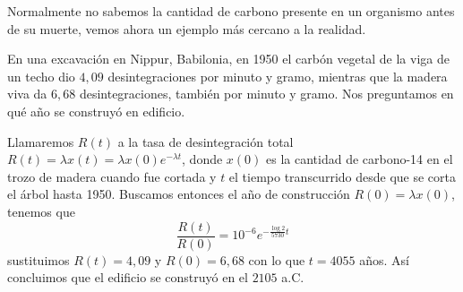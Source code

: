 \documentclass[../main.tex]{subfiles}
\begin{document}
Normalmente no sabemos la cantidad de carbono presente en un organismo antes de
su muerte, vemos ahora un ejemplo más cercano a la realidad.

\begin{example}
	En una excavación en Nippur, Babilonia, en 1950 el carbón vegetal de la viga
	de un techo dio \(4,09\) desintegraciones por minuto y gramo, mientras que
	la madera viva da \(6,68\) desintegraciones, también por minuto y gramo.
	Nos preguntamos en qué año se construyó en edificio.
\end{example}

\begin{solution}
	Llamaremos \(R(t)\) a la tasa de desintegración total
	\(R(t) = \lambda x(t) = \lambda x(0) e^{-\lambda t}\), donde \(x(0)\) es la
	cantidad de carbono-14 en el trozo de madera cuando fue cortada y \(t\) el
	tiempo transcurrido desde que se corta el árbol hasta 1950. Buscamos entonces
	el año de construcción \(R(0) = \lambda x(0)\), tenemos que
	\[\frac{R(t)}{R(0)} = 10^{-6} e^{-\frac{\log 2}{5730} t}\]
	sustituimos \(R(t) = 4,09\) y \(R(0) = 6,68\) con lo que \(t = 4055\) años. Así
	concluimos que el edificio se construyó en el \(2105\) a.C.
\end{solution}
\end{document}
